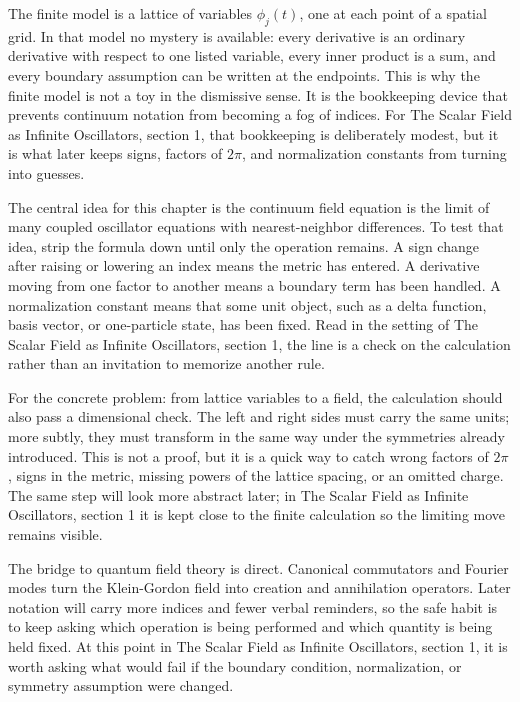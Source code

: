The finite model is a lattice of variables \(\phi_j(t)\), one at each point of a spatial grid.  In that model no mystery is available: every derivative is an ordinary derivative with respect to one listed variable, every inner product is a sum, and every boundary assumption can be written at the endpoints.  This is why the finite model is not a toy in the dismissive sense.  It is the bookkeeping device that prevents continuum notation from becoming a fog of indices.  For The Scalar Field as Infinite Oscillators, section 1, that bookkeeping is deliberately modest, but it is what later keeps signs, factors of \(2\pi\), and normalization constants from turning into guesses.

The central idea for this chapter is the continuum field equation is the limit of many coupled oscillator equations with nearest-neighbor differences.  To test that idea, strip the formula down until only the operation remains.  A sign change after raising or lowering an index means the metric has entered.  A derivative moving from one factor to another means a boundary term has been handled.  A normalization constant means that some unit object, such as a delta function, basis vector, or one-particle state, has been fixed.  Read in the setting of The Scalar Field as Infinite Oscillators, section 1, the line is a check on the calculation rather than an invitation to memorize another rule.

For the concrete problem: from lattice variables to a field, the calculation should also pass a dimensional check.  The left and right sides must carry the same units; more subtly, they must transform in the same way under the symmetries already introduced.  This is not a proof, but it is a quick way to catch wrong factors of \(2\pi\), signs in the metric, missing powers of the lattice spacing, or an omitted charge.  The same step will look more abstract later; in The Scalar Field as Infinite Oscillators, section 1 it is kept close to the finite calculation so the limiting move remains visible.

The bridge to quantum field theory is direct.  Canonical commutators and Fourier modes turn the Klein-Gordon field into creation and annihilation operators.  Later notation will carry more indices and fewer verbal reminders, so the safe habit is to keep asking which operation is being performed and which quantity is being held fixed.  At this point in The Scalar Field as Infinite Oscillators, section 1, it is worth asking what would fail if the boundary condition, normalization, or symmetry assumption were changed.

